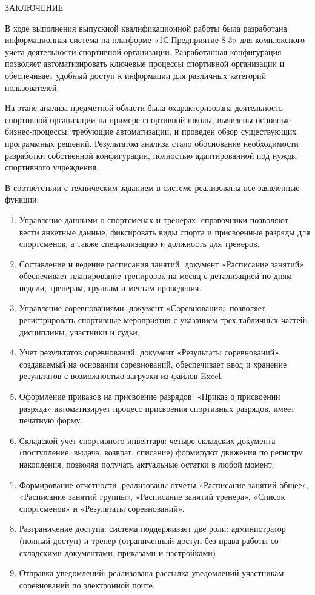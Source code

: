 \newpage
\begin{center}
	{ЗАКЛЮЧЕНИЕ}
\end{center}

В ходе выполнения выпускной квалификационной работы была разработана информационная система на платформе «1С:Предприятие 8.3» для комплексного учета деятельности спортивной организации. Разработанная конфигурация позволяет автоматизировать ключевые процессы спортивной организации и обеспечивает удобный доступ к информации для различных категорий пользователей.

На этапе анализа предметной области была охарактеризована деятельность спортивной организации на примере спортивной школы, выявлены основные бизнес-процессы, требующие автоматизации, и проведен обзор существующих программных решений. Результатом анализа стало обоснование необходимости разработки собственной конфигурации, полностью адаптированной под нужды спортивного учреждения.

В соответствии с техническим заданием в системе реализованы все заявленные функции:

\begin{enumerate}
	\item Управление данными о спортсменах и тренерах: справочники позволяют вести анкетные данные, фиксировать виды спорта и присвоенные разряды для спортсменов, а также специализацию и должность для тренеров.
	\item Составление и ведение расписания занятий: документ «Расписание занятий» обеспечивает планирование тренировок на месяц с детализацией по дням недели, тренерам, группам и местам проведения.
	\item Управление соревнованиями: документ «Соревнования» позволяет регистрировать спортивные мероприятия с указанием трех табличных частей: дисциплины, участники и судьи.
	\item Учет результатов соревнований: документ «Результаты соревнований», создаваемый на основании соревнований, обеспечивает ввод и хранение результатов с возможностью загрузки из файлов Excel.
	\item Оформление приказов на присвоение разрядов: «Приказ о присвоении разряда» автоматизирует процесс присвоения спортивных разрядов, имеет печатную форму.
	\item Складской учет спортивного инвентаря: четыре складских документа (поступление, выдача, возврат, списание) формируют движения по регистру накопления, позволяя получать актуальные остатки в любой момент.
	\item Формирование отчетности: реализованы отчеты «Расписание занятий общее», «Расписание занятий группы», «Расписание занятий тренера», «Список спортсменов» и «Результаты соревнований».
	\item Разграничение доступа: система поддерживает две роли: администратор (полный доступ) и тренер (ограниченный доступ без права работы со складскими документами, приказами и настройками).
	\item Отправка уведомлений: реализована рассылка уведомлений участникам соревнований по электронной почте.
\end{enumerate}

